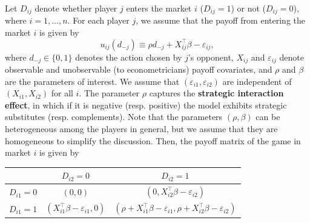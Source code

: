\documentclass[10.5pt, A4paper, openany, uplatex]{book}
\newcommand{\eps}{\varepsilon}
\numberwithin{equation}{section}
\begin{document}
Let $D_{ij}$ denote whether player $j$ enters the market $i$ ($D_{ij} = 1$) or not ($D_{ij} = 0$), where $i = 1, \ldots, n$.
For each player $j$, we assume that the payoff from entering the market $i$ is given by
\[
	u_{ij}(d_{-j}) \equiv \rho d_{-j} + X_{ij}^\top \beta - \eps_{ij},
\]
where $d_{-j}\in\{0,1\}$ denotes the action chosen by $j$'s opponent, $X_{ij}$ and $\eps_{ij}$ denote observable and unobservable (to econometricians) payoff covariates, and $\rho$ and $\beta$ are the parameters of interest.
We assume that $(\eps_{i1}, \eps_{i2})$ are independent of $(X_{i1}, X_{i2})$ for all $i$.
The parameter $\rho$ captures the \textbf{strategic interaction effect}, in which if it is negative (resp. positive) the model exhibits strategic substitutes (resp. complements).
Note that the parameters $(\rho, \beta)$ can be heterogeneous among the players in general, but we assume that they are homogeneous to simplify the discussion.
Then, the payoff matrix of the game in market $i$ is given by
\begin{center}
\begin{tabular}{c|c|c}
	\hline
	             & $D_{i2} = 0$ & $D_{i2} = 1$ \\ \hline
	$D_{i1} = 0$ & $(0, 0)$     & $(0, X_{i2}^\top \beta - \eps_{i2})$ \\ \hline 
	$D_{i1} = 1$ & $(X_{i1}^\top \beta - \eps_{i1}, 0)$ & $(\rho + X_{i1}^\top \beta - \eps_{i1}, \rho + X_{i2}^\top \beta - \eps_{i2})$\\ \hline
\end{tabular}
\end{center}
\end{document}
